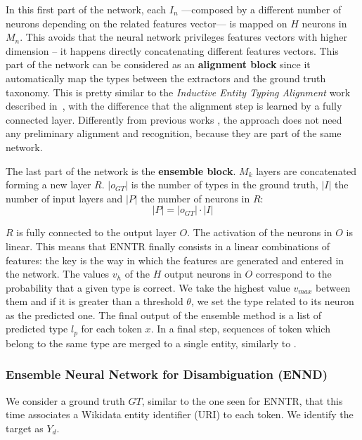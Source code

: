 \documentclass{llncs}
\begin{document}
In this first part of the network, each $I_n$ ---composed by a different number of neurons depending on the related features vector--- is mapped on $H$ neurons in $M_n$. This avoids that the neural network privileges features vectors with higher dimension -- it happens directly concatenating different features vectors. This part of the network can be considered as an \textbf{alignment block} since it automatically map the types between the extractors and the ground truth taxonomy. This is pretty similar to the \textit{Inductive Entity Typing Alignment} work described in~\cite{nerd4}, with the difference that the alignment step is learned by a fully connected layer. Differently from previous works \cite{fox1,fox2}, the approach does not need any preliminary alignment and recognition, because they are part of the same network. 

The last part of the network is the \textbf{ensemble block}. $M_k$ layers are concatenated forming a new layer $R$. $\left\vert{o_{GT}}\right\vert$ is the number of types in the ground truth, $\left\vert{I}\right\vert$ the number of input layers and $\left\vert{P}\right\vert$ the number of neurons in $R$:
 $$\left\vert{P}\right\vert =  \left\vert{o_{GT}}\right\vert \cdot \left\vert{I}\right\vert$$
 
$R$ is fully connected to the output layer $O$. The activation of the neurons in $O$ is linear. This means that ENNTR finally consists in a linear combinations of features: the key is the way in which the features are generated and entered in the network. The values $v_h$ of the $H$ output neurons in $O$ correspond to the probability that a given type is correct. We take the highest value $v_{max}$ between them and if it is greater than a threshold $\theta$, we set the type related to its neuron as the predicted one. The final output of the ensemble method is a list of predicted type $l_{p}$ for each token $x$. In a final step, sequences of token which belong to the same type are merged to a single entity, similarly to \cite{fox1,fox2}.

\subsubsection{Ensemble Neural Network for Disambiguation (ENND)}
We consider a ground truth $GT$, similar to the one seen for ENNTR, that this time associates a Wikidata entity identifier (URI) to each token. We identify the target as $Y_d$.
\end{document}
